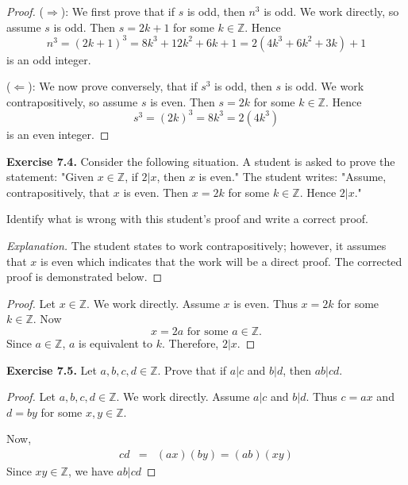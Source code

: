 \documentclass[12pt,oneside]{article}
\newenvironment{exercise}[1]{\vspace{.1in}\noindent\textbf{Exercise #1 \hspace{.05em}}}{}
\newcommand{\Z}{\mathbb{Z}}
\begin{document}
\begin{proof}
($\Rightarrow$): We first prove that if $s$ is odd, then $n^3$ is odd. We work directly, so assume $s$ is odd. Then $s=2k + 1$ for some $k \in \Z$. Hence
\[n^3 = (2k + 1)^3=8k^3+12k^2+6k+1=2(4k^3+6k^2+3k)+1\]
is an odd integer.

($\Leftarrow$): We now prove conversely, that if $s^3$ is odd, then $s$ is odd. We work contrapositively, so assume $s$ is even. Then $s = 2k$ for some $k \in \Z$. Hence
\[s^3=(2k)^3=8k^3=2(4k^3)\]
is an even integer.
    
\end{proof}



\begin{exercise}{7.4.}
Consider the following situation. A student is asked to prove the statement: "Given $x \in \Z$, if $2|x$, then $x$ is even." The student writes: "Assume, contrapositively, that $x$ is even. Then $x = 2k$ for some $k \in \Z$. Hence $2|x$."

Identify what is wrong with this student's proof and write a correct proof.
\end{exercise}

\begin{proof}[Explanation]
The student states to work contrapositively; however, it assumes that $x$ is even which indicates that the work will be a direct proof. The corrected proof is demonstrated below.
\end{proof}

\begin{proof}
Let $x \in \Z$. We work directly. Assume $x$ is even. Thus $x = 2k$ for some $k \in \Z$. Now
\[x = 2a \text{ for some } a \in \Z.\]
Since $a \in \Z$, $a$ is equivalent to $k$. Therefore, $2|x$.
\end{proof}



\begin{exercise}{7.5.}
Let $a,b,c,d \in \Z$. Prove that if $a|c$ and $b|d$, then $ab|cd$.
\end{exercise}

\begin{proof}
Let $a,b,c,d \in \Z$. We work directly. Assume $a|c$ and $b|d$. Thus $c=ax$ and $d=by$ for some $x,y \in \Z$. 

Now,
\begin{eqnarray*}
cd &=& (ax)(by) = (ab)(xy)
\end{eqnarray*}
Since $xy \in \Z$, we have $ab|cd$
\end{proof}
\end{document}
